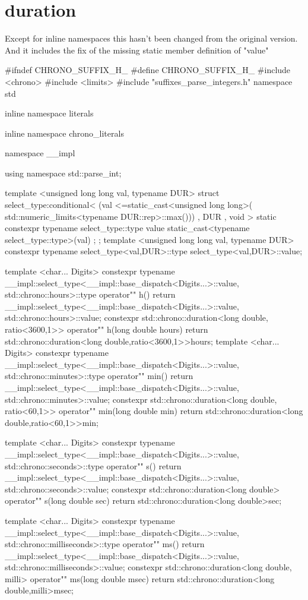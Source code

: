 \documentclass[ebook,11pt,article]{memoir}
\begin{document}
\section{duration}
Except for inline namespaces this hasn't been changed from the original version. And it includes the fix of the missing static member definition of "value"
\begin{codeblock}
#ifndef CHRONO_SUFFIX_H_
#define CHRONO_SUFFIX_H_
#include <chrono>
#include <limits>
#include "suffixes_parse_integers.h"
namespace std {
inline namespace literals {
inline namespace chrono_literals{

namespace __impl {
using namespace std::parse_int;

template <unsigned long long val, typename DUR>
struct select_type:conditional<
    (val <=static_cast<unsigned long long>(
            std::numeric_limits<typename DUR::rep>::max()))
	, DUR , void > {
		static constexpr typename select_type::type
			value{ static_cast<typename select_type::type>(val) };
};
template <unsigned long long val, typename DUR>
constexpr typename select_type<val,DUR>::type select_type<val,DUR>::value;
}

template <char... Digits>
constexpr typename
__impl::select_type<__impl::base_dispatch<Digits...>::value,
std::chrono::hours>::type
operator"" h(){
	return  __impl::select_type<__impl::base_dispatch<Digits...>::value,
	        std::chrono::hours>::value;
}
constexpr std::chrono::duration<long double, ratio<3600,1>>
operator"" h(long double hours){
	return std::chrono::duration<long double,ratio<3600,1>>{hours};
}
template <char... Digits>
constexpr typename
__impl::select_type<__impl::base_dispatch<Digits...>::value,
std::chrono::minutes>::type
operator"" min(){
	return __impl::select_type<__impl::base_dispatch<Digits...>::value,
	       std::chrono::minutes>::value;
}
constexpr std::chrono::duration<long double, ratio<60,1>>
operator"" min(long double min){
	return std::chrono::duration<long double,ratio<60,1>>{min};
}

template <char... Digits>
constexpr typename
__impl::select_type<__impl::base_dispatch<Digits...>::value,
std::chrono::seconds>::type
operator"" s(){
	return __impl::select_type<__impl::base_dispatch<Digits...>::value,
	       std::chrono::seconds>::value;
}
constexpr std::chrono::duration<long double>
operator"" s(long double sec){
	return std::chrono::duration<long double>{sec};
}

template <char... Digits>
constexpr typename
__impl::select_type<__impl::base_dispatch<Digits...>::value,
std::chrono::milliseconds>::type
operator"" ms(){
	return __impl::select_type<__impl::base_dispatch<Digits...>::value,
	       std::chrono::milliseconds>::value;
}
constexpr std::chrono::duration<long double, milli>
operator"" ms(long double msec){
	return std::chrono::duration<long double,milli>{msec};
}

}}}
\end{codeblock}
\end{document}
